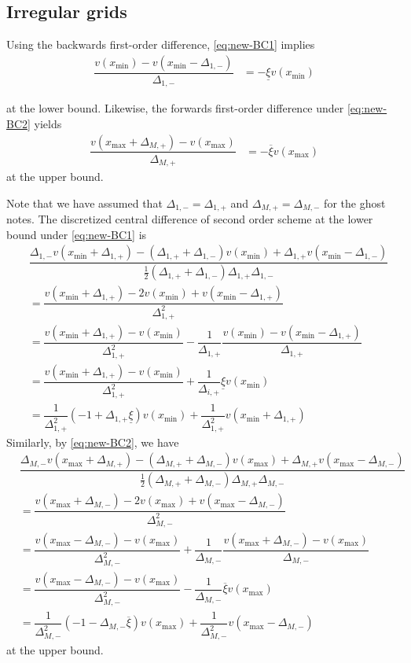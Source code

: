 \documentclass[11pt]{article}
\begin{document}
\subsection{Irregular grids}
Using the backwards first-order difference, \eqref{eq:new-BC1} implies
\begin{align}
\dfrac{v({x_{\min}}) - v({x_{\min}}-\Delta_{1, -})}{\Delta_{1, -}} &= - \underline{\xi} v({x_{\min}})
\end{align}

at the lower bound. Likewise, the forwards first-order difference under \eqref{eq:new-BC2} yields
\begin{align}
\dfrac{v({x_{\max}} + \Delta_{M, +}) - v( {x_{\max}})}{\Delta_{M, +}} &= - \overline{\xi} v({x_{\max}})
\end{align}
at the upper bound.

Note that we have assumed that $\Delta_{1,-} = \Delta_{1,+}$ and $\Delta_{M,+} = \Delta_{M,-}$ for the ghost notes. The discretized central difference of second order scheme at the lower bound under \eqref{eq:new-BC1} is 
\begin{align}
&\dfrac{\Delta_{1,-} v( {x_{\min}} + \Delta_{1,+}) - (\Delta_{1,+} + \Delta_{1,-}) v({x_{\min}}) + \Delta_{1,+}  v( {x_{\min}} - \Delta_{1,-})}{\frac{1}{2}(\Delta_{1,+} + \Delta_{1,-}) \Delta_{1,+} \Delta_{1,-} } \\
&=
\dfrac{v ({x_{\min}}+\Delta_{1, +}) - 2 v({x_{\min}}) + v({x_{\min}}-\Delta_{1, +})}{\Delta_{1, +}^2} \\ 
&= \dfrac{v({x_{\min}} + \Delta_{1, +}) - v({x_{\min}})}{\Delta_{1, +}^2} - \dfrac{1}{\Delta_{1, +}}\dfrac{v({x_{\min}}) - v({x_{\min}}-\Delta_{1, +}) }{\Delta_{1, +}}  \\
&= \dfrac{v({x_{\min}} + \Delta_{1, +}) - v({x_{\min}})}{\Delta_{1, +}^2} + \dfrac{1}{\Delta_{i,+}} \underline{\xi} v({x_{\min}})  \\ 
&= \dfrac{1}{\Delta_{1, +}^2}  (- 1 + \Delta_{1, +} \underline{\xi}) v({x_{\min}})  + \dfrac{1}{\Delta_{1, +}^2}  v({x_{\min}} + \Delta_{1, +})  
\end{align}
Similarly, by \eqref{eq:new-BC2}, we have
\begin{align}
&\dfrac{\Delta_{M,-} v( {x_{\max}} + \Delta_{M,+}) - (\Delta_{M,+} + \Delta_{M,-}) v({x_{\max}} ) + \Delta_{M,+}  v( {x_{\max}} - \Delta_{M,-})}{\frac{1}{2}(\Delta_{M,+} + \Delta_{M,-}) \Delta_{M,+} \Delta_{M,-} } \\
&=\dfrac{v ({x_{\max}} + \Delta_{M,-}) - 2 v({x_{\max}} ) + v({x_{\max}} -\Delta_{M,-})}{\Delta_{M,-}^2} \\
&=   \dfrac{v({x_{\max}} - \Delta_{M,-}) - v({x_{\max}})}{\Delta_{M,-}^2} + \dfrac{1}{\Delta_{M,-}}\dfrac{ v({x_{\max}}+\Delta_{M,-}) - v ({x_{\max}}) }{\Delta_{M,-}}  \\
&= \dfrac{v({x_{\max}} - \Delta_{M,-}) - v({x_{\max}})}{\Delta_{M,-}^2}  - \dfrac{1}{\Delta_{M,-}} \overline{\xi} v({x_{\max}})  \\ 
&= \dfrac{1}{\Delta_{M,-}^2}  (- 1 - \Delta_{M,-} \overline{\xi}) v({x_{\max}})  + \dfrac{1}{\Delta_{M,-}^2}  v({x_{\max}} - \Delta_{M,-})  
\end{align}
at the upper bound.
\end{document}
